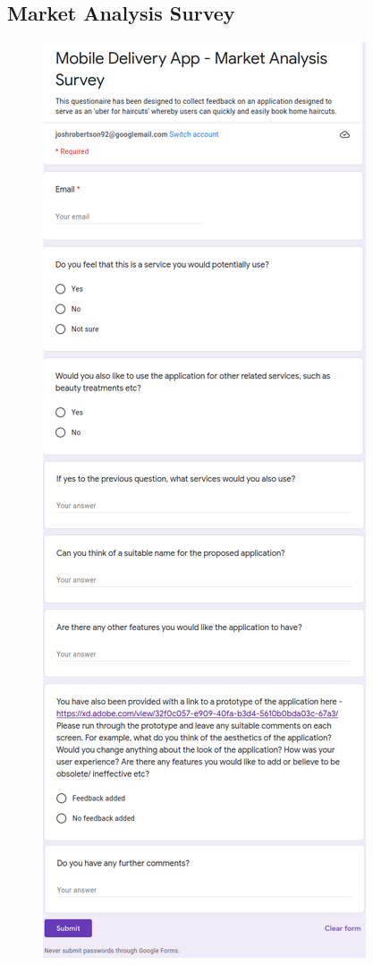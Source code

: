 \documentclass[12pt]{article}
\begin{document}
	\subsection{Market Analysis Survey}
	\label{market-analysis-survey}
	\begin{figure}[H]
		\centering
		\includegraphics[scale=1]{images/market-analysis-survey.png}
	\end{figure}
\end{document}
